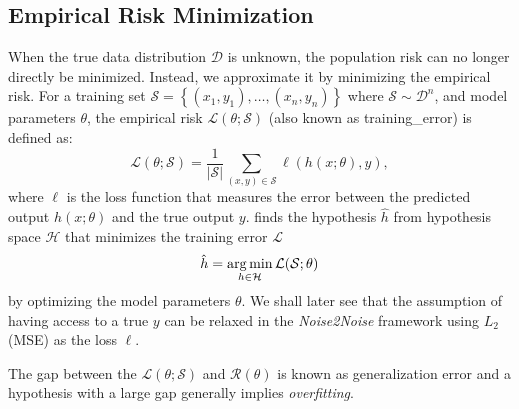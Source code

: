 \subsection{Empirical Risk Minimization}\label{sec:erm}
When the true data distribution $\mathcal{D}$ is unknown, the population risk can no longer directly be minimized. Instead, we approximate it by minimizing the empirical risk. For a training set $\mathcal{S} = \left\{ (x_1, y_1), \ldots, (x_n, y_n) \right\}$ where $\mathcal{S} \sim \mathcal{D}^n$, and model parameters $\theta$, the empirical risk $\mathcal{L}(\theta; \mathcal{S})$ (also known as \gls{training_error}) is defined as:
\begin{equation}
    \mathcal{L}(\theta; \mathcal{S}) = \frac{1}{\lvert \mathcal{S} \rvert} \sum_{(x, y) \in \mathcal{S}} \ell(h(x; \theta), y),
\end{equation}
where $\ell$ is the loss function that measures the error between the predicted output $h(x; \theta)$ and the true output $y$.  finds the hypothesis $\hat{h}$ from hypothesis space $\mathcal{H}$ that minimizes the training error $\mathcal{L}$
\begin{equation}\label{eq:erm}
    \hat{h} = \operatorname*{arg\,min}_{h \in \mathcal{H}} \mathcal{L}(\mathcal{S};\theta)
\end{equation}
by optimizing the model parameters $\theta$.
We shall later see that the assumption of having access to a true $y$ can be relaxed in the \textit{Noise2Noise} framework using $L_2$ (\gls{MSE}) as the loss $\ell$.

The gap between the $\mathcal{L}(\theta; \mathcal{S})$ and $\mathcal{R}(\theta)$ is known as generalization error and a hypothesis with a large gap generally implies \textit{overfitting}.

